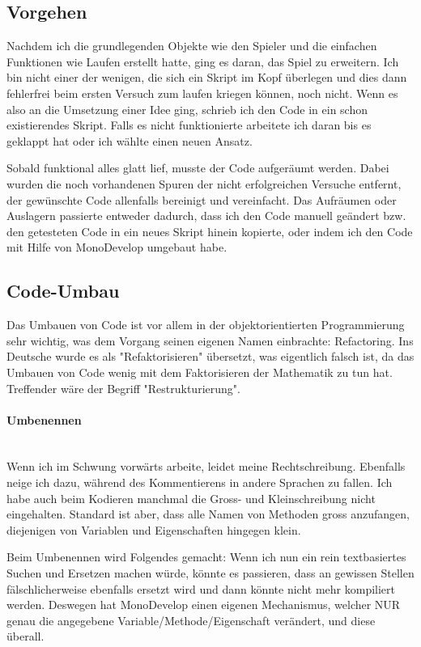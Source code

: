 \subsection{Vorgehen}
Nachdem ich die grundlegenden Objekte wie den Spieler und die einfachen Funktionen wie Laufen erstellt hatte, ging es daran, das Spiel zu erweitern. Ich bin nicht einer der wenigen, die sich ein Skript im Kopf überlegen und dies dann fehlerfrei beim ersten Versuch zum laufen kriegen können, noch nicht. Wenn es also an die Umsetzung einer Idee ging, schrieb ich den Code in ein schon existierendes Skript.
Falls es nicht funktionierte arbeitete ich daran bis es geklappt hat oder ich wählte einen neuen Ansatz.

Sobald funktional alles glatt lief, musste der Code aufgeräumt werden. Dabei wurden die noch vorhandenen Spuren der nicht erfolgreichen Versuche entfernt, der gewünschte Code allenfalls bereinigt und vereinfacht. Das Aufräumen oder Auslagern passierte entweder dadurch, dass ich den Code manuell geändert bzw. den getesteten Code in ein neues Skript hinein kopierte, oder indem ich den Code mit Hilfe von MonoDevelop umgebaut habe.

\subsection{Code-Umbau}
\label{subsubsec:refactoring}
Das Umbauen von Code ist vor allem in der objektorientierten Programmierung sehr wichtig, was dem Vorgang seinen eigenen Namen einbrachte: Refactoring. Ins Deutsche wurde es als "Refaktorisieren" übersetzt, was eigentlich falsch ist, da das Umbauen von Code wenig mit dem Faktorisieren der Mathematik zu tun hat.
Treffender wäre der Begriff "Restrukturierung".


\paragraph{Umbenennen}\mbox{} \\
Wenn ich im Schwung vorwärts arbeite, leidet meine Rechtschreibung. Ebenfalls neige ich dazu, während des Kommentierens in andere Sprachen zu fallen. Ich habe auch beim Kodieren manchmal die Gross- und Kleinschreibung nicht eingehalten. Standard ist aber, dass alle Namen von Methoden gross anzufangen, diejenigen von Variablen und Eigenschaften hingegen klein.

Beim Umbenennen wird Folgendes gemacht:
Wenn ich nun ein rein textbasiertes Suchen und Ersetzen machen würde, könnte es passieren, dass an gewissen Stellen fälschlicherweise ebenfalls ersetzt wird und dann könnte nicht mehr kompiliert werden. Deswegen hat MonoDevelop einen eigenen Mechanismus, welcher NUR genau die angegebene Variable/Methode/Eigenschaft verändert, und diese überall.

